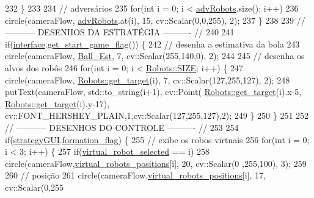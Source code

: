 \begin{DoxyCode}
232             \}
233 
234             \textcolor{comment}{// adversários}
235             \textcolor{keywordflow}{for}(\textcolor{keywordtype}{int} i = 0; i < \hyperlink{class_cam_cap_ae72873010cb7dae6e9842ccae917cae3}{advRobots}.size(); i++)
236                 circle(cameraFlow, \hyperlink{class_cam_cap_ae72873010cb7dae6e9842ccae917cae3}{advRobots}.at(i), 15, cv::Scalar(0,0,255), 2);
237         \}
238 
239         \textcolor{comment}{// ----------- DESENHOS DA ESTRATÉGIA ---------- //}
240 
241         \textcolor{keywordflow}{if}(\hyperlink{class_cam_cap_a58002893dfb61307042ddbba0c362dcd}{interface}.\hyperlink{class_v_s_s_s___g_u_i_1_1_v4_l_interface_afb1f877ebf3a82de783f6860979eea85}{get\_start\_game\_flag}()) \{
242             \textcolor{comment}{// desenha a estimativa da bola}
243             circle(cameraFlow, \hyperlink{class_cam_cap_ae91debabf4943c74262acf6d60c6930f}{Ball\_Est}, 7, cv::Scalar(255,140,0), 2);
244 
245             \textcolor{comment}{// desenha os alvos dos robôs}
246             \textcolor{keywordflow}{for}(\textcolor{keywordtype}{int} i = 0; i < \hyperlink{class_robots_ae9df2f1d345ad6740f0459956cdd4712}{Robots::SIZE}; i++) \{
247                 circle(cameraFlow, \hyperlink{class_robots_a8a4fe339df4823e45cf34d9fb8daa64b}{Robots::get\_target}(i), 7, cv::Scalar(127,255,127), 2);
248                 putText(cameraFlow, std::to\_string(i+1), cv::Point(
      \hyperlink{class_robots_a8a4fe339df4823e45cf34d9fb8daa64b}{Robots::get\_target}(i).x-5, \hyperlink{class_robots_a8a4fe339df4823e45cf34d9fb8daa64b}{Robots::get\_target}(i).y-17),
      cv::FONT\_HERSHEY\_PLAIN,1,cv::Scalar(127,255,127),2);
249             \}
250         \}
251 
252         \textcolor{comment}{// ----------- DESENHOS DO CONTROLE ---------- //}
253 
254         \textcolor{keywordflow}{if}(\hyperlink{class_cam_cap_a71ae899fee6c1b02de3c373965208e52}{strategyGUI}.\hyperlink{class_strategy_g_u_i_aaac145125516fb8b7fe7137db18cdb58}{formation\_flag}) \{
255             \textcolor{comment}{// exibe os robos virtuais}
256             \textcolor{keywordflow}{for}(\textcolor{keywordtype}{int} i = 0; i < 3; i++) \{
257                 \textcolor{keywordflow}{if}(\hyperlink{class_cam_cap_a6709fb57a514b9aa6ee943b2b57fdbe7}{virtual\_robot\_selected} == i)
258                     circle(cameraFlow,\hyperlink{class_cam_cap_afdbec56c1e17c308441cf2eaad035e45}{virtual\_robots\_positions}[i], 20, cv::Scalar(0
      ,255,100), 3);
259 
260                 \textcolor{comment}{// posição}
261                 circle(cameraFlow,\hyperlink{class_cam_cap_afdbec56c1e17c308441cf2eaad035e45}{virtual\_robots\_positions}[i], 17, cv::Scalar(0,255

\end{DoxyCode}
